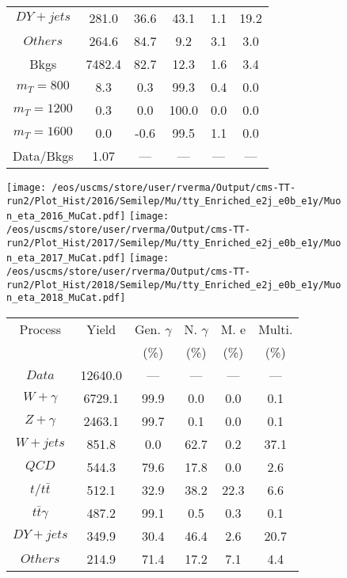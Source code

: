 \begin{figure}
\begin{minipage}[c]{0.32\textwidth}
{\begin{tabular}{cccccc}
$ DY+jets $ &  281.0 &  36.6 &  43.1 &  1.1 &  19.2\\
$ Others $ &  264.6 &  84.7 &  9.2 &  3.1 &  3.0\\
Bkgs &  7482.4 &  82.7 &  12.3 &  1.6 &  3.4\\
$ m_{T} = 800 $ &  8.3 &  0.3 &  99.3 &  0.4 &  0.0\\
$ m_{T} = 1200 $ &  0.3 &  0.0 &  100.0 &  0.0 &  0.0\\
$ m_{T} = 1600 $ &  0.0 &  -0.6 &  99.5 &  1.1 &  0.0\\
Data/Bkgs &  1.07 &  --- &  --- &  --- &  ---\\
\hline
\end{tabular}
}
\end{minipage}
\end{figure}

\begin{figure}
\centering
\texttt{[image: /eos/uscms/store/user/rverma/Output/cms-TT-run2/Plot\_Hist/2016/Semilep/Mu/tty\_Enriched\_e2j\_e0b\_e1y/Muon\_eta\_2016\_MuCat.pdf]}
\texttt{[image: /eos/uscms/store/user/rverma/Output/cms-TT-run2/Plot\_Hist/2017/Semilep/Mu/tty\_Enriched\_e2j\_e0b\_e1y/Muon\_eta\_2017\_MuCat.pdf]}
\texttt{[image: /eos/uscms/store/user/rverma/Output/cms-TT-run2/Plot\_Hist/2018/Semilep/Mu/tty\_Enriched\_e2j\_e0b\_e1y/Muon\_eta\_2018\_MuCat.pdf]}
\begin{minipage}[c]{0.32\textwidth}
\centering
\tiny{
\begin{tabular}{cccccc}
\hline
Process & Yield & Gen. $\gamma$ & N. $\gamma$ & M. e & Multi. \\
 &  & (\%) & (\%) & (\%) & (\%)  \\
\hline
                                                                      $ Data $ &  12640.0 &  --- &  --- &  --- &  ---\\
$ W+\gamma $ &  6729.1 &  99.9 &  0.0 &  0.0 &  0.1\\
$ Z+\gamma $ &  2463.1 &  99.7 &  0.1 &  0.0 &  0.1\\
$ W+jets $ &  851.8 &  0.0 &  62.7 &  0.2 &  37.1\\
$ QCD $ &  544.3 &  79.6 &  17.8 &  0.0 &  2.6\\
$ t/t\bar{t} $ &  512.1 &  32.9 &  38.2 &  22.3 &  6.6\\
$ t\bar{t}\gamma $ &  487.2 &  99.1 &  0.5 &  0.3 &  0.1\\
$ DY+jets $ &  349.9 &  30.4 &  46.4 &  2.6 &  20.7\\
$ Others $ &  214.9 &  71.4 &  17.2 &  7.1 &  4.4\\

\end{tabular}}
\end{minipage}
\end{figure}
